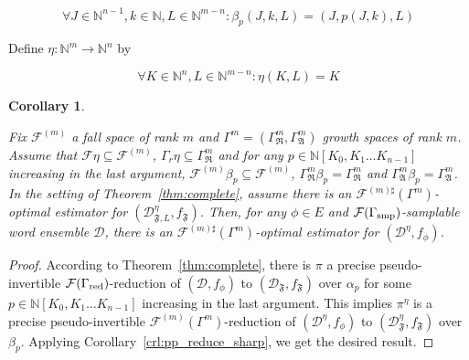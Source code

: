 \documentclass{article}
\numberwithin{equation}{section}
\theoremstyle{definition}
\theoremstyle{plain}
\newtheorem{corollary}{Corollary}[section]
\newcommand{\Nats}{\mathbb{N}}
\newcommand{\NatPoly}{\Nats[K_0, K_1 \ldots K_{n-1}]}
\newcommand{\Dist}{\mathcal{D}}
\newcommand{\GrowR}{\Gamma_{\mathfrak{R}}}
\newcommand{\GrowA}{\Gamma_{\mathfrak{A}}}
\newcommand{\Fall}{\mathcal{F}}
\begin{document}
\begin{equation}
\forall J \in \Nats^{n-1}, k \in \Nats, L \in \Nats^{m-n}: \beta_p(J,k,L)=(J,p(J,k),L)
\end{equation}

Define ${\eta: \Nats^{m} \rightarrow \Nats^n}$ by

\begin{equation}
\forall K \in \Nats^n, L \in \Nats^{m-n}: \eta(K,L)=K
\end{equation}


\begin{samepage}
\begin{corollary}
\label{crl:complete_sharp}

Fix ${\Fall^{(m)}}$ a fall space of rank ${m}$ and ${\Gamma^m=(\GrowR^m, \GrowA^m)}$ growth spaces of rank ${m}$. Assume that ${\Fall \eta \subseteq \Fall^{(m)}}$, ${\Gamma_r \eta \subseteq \GrowR^{m}}$ and for any ${p \in \NatPoly}$ increasing in the last argument, ${\Fall^{(m)} \beta_p \subseteq \Fall^{(m)}}$, ${\GrowR^m \beta_p = \GrowR^m}$ and ${\GrowA^m \beta_p = \GrowA^m}$. In the setting of Theorem~\ref{thm:complete}, assume there is an ${\Fall^{(m)\sharp}(\Gamma^m)}$-optimal estimator for ${(\Dist_{\mathfrak{F},L}^\eta,f_{\mathfrak{F}})}$. Then, for any ${\phi \in E}$ and ${\Fall(\Gamma_{\textnormal{smp}})}$-samplable word ensemble ${\Dist}$, there is an ${\Fall^{(m)\sharp}(\Gamma^m)}$-optimal estimator for ${(\Dist^\eta,f_\phi)}$.

\end{corollary}
\end{samepage}

\begin{proof}

According to Theorem~\ref{thm:complete}, there is ${\pi}$ a precise pseudo-invertible ${\Fall(\Gamma_{\textnormal{red}})}$-reduction of ${(\Dist,f_\phi)}$ to ${(\Dist_{\mathfrak{F}},f_{\mathfrak{F}})}$ over ${\alpha_p}$ for some ${p \in \NatPoly}$  increasing in the last argument. This implies ${\pi^\eta}$ is a precise pseudo-invertible ${\Fall^{(m)}(\Gamma^m)}$-reduction of ${(\Dist^\eta,f_\phi)}$ to ${(\Dist_{\mathfrak{F}}^\eta,f_{\mathfrak{F}})}$ over ${\beta_p}$. Applying Corollary~\ref{crl:pp_reduce_sharp}, we get the desired result. 
%
\end{proof}
\end{document}
